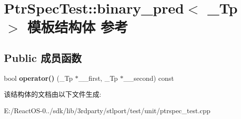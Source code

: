 \hypertarget{struct_ptr_spec_test_1_1binary__pred}{}\section{Ptr\+Spec\+Test\+:\+:binary\+\_\+pred$<$ \+\_\+\+Tp $>$ 模板结构体 参考}
\label{struct_ptr_spec_test_1_1binary__pred}
\subsection*{Public 成员函数}
\begin{DoxyCompactItemize}
\item 
\mbox{\label{struct_ptr_spec_test_1_1binary__pred_a0a59ddef9a00a8f886a895ce47de2bb9}} 
bool {\bfseries operator()} (\+\_\+\+Tp $\ast$\+\_\+\+\_\+first, \+\_\+\+Tp $\ast$\+\_\+\+\_\+second) const
\end{DoxyCompactItemize}


该结构体的文档由以下文件生成\+:\begin{DoxyCompactItemize}
\item 
E\+:/\+React\+O\+S-\/0../sdk/lib/3rdparty/stlport/test/unit/ptrspec\+\_\+test.\+cpp\end{DoxyCompactItemize}
